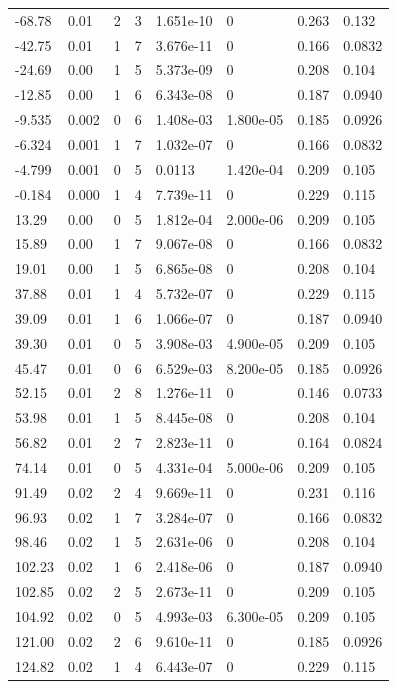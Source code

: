 \documentclass[preview]{standalone}
\begin{document}
{{\begin{tabular}{L{1.2cm}C{1.2cm} C{0.3cm}C{0.5cm} C{1.4cm}C{1.4cm} C{1.4cm}C{1.4cm}}
  -68.78  &  0.01  & 2     &  3 &  1.651e-10  & 0  & 0.263 &  0.132   \\ 
  -42.75  &  0.01  & 1     &  7 &  3.676e-11  & 0  & 0.166 &  0.0832   \\ 
  -24.69  &  0.00  & 1     &  5 &  5.373e-09  & 0  & 0.208 &  0.104   \\ 
  -12.85  &  0.00  & 1     &  6 &  6.343e-08  & 0  & 0.187 &  0.0940   \\ 
  -9.535  &  0.002  & 0     &  6 &  1.408e-03  & 1.800e-05  & 0.185 &  0.0926   \\ 
  -6.324  &  0.001  & 1     &  7 &  1.032e-07  & 0  & 0.166 &  0.0832   \\ 
  -4.799  &  0.001  & 0     &  5 &  0.0113  & 1.420e-04  & 0.209 &  0.105   \\ 
  -0.184  &  0.000  & 1     &  4 &  7.739e-11  & 0  & 0.229 &  0.115   \\ 
  13.29  &  0.00  & 0     &  5 &  1.812e-04  & 2.000e-06  & 0.209 &  0.105   \\ 
  15.89  &  0.00  & 1     &  7 &  9.067e-08  & 0  & 0.166 &  0.0832   \\ 
  19.01  &  0.00  & 1     &  5 &  6.865e-08  & 0  & 0.208 &  0.104   \\ 
  37.88  &  0.01  & 1     &  4 &  5.732e-07  & 0  & 0.229 &  0.115   \\ 
  39.09  &  0.01  & 1     &  6 &  1.066e-07  & 0  & 0.187 &  0.0940   \\ 
  39.30  &  0.01  & 0     &  5 &  3.908e-03  & 4.900e-05  & 0.209 &  0.105   \\ 
  45.47  &  0.01  & 0     &  6 &  6.529e-03  & 8.200e-05  & 0.185 &  0.0926   \\ 
  52.15  &  0.01  & 2     &  8 &  1.276e-11  & 0  & 0.146 &  0.0733   \\ 
  53.98  &  0.01  & 1     &  5 &  8.445e-08  & 0  & 0.208 &  0.104   \\ 
  56.82  &  0.01  & 2     &  7 &  2.823e-11  & 0  & 0.164 &  0.0824   \\ 
  74.14  &  0.01  & 0     &  5 &  4.331e-04  & 5.000e-06  & 0.209 &  0.105   \\ 
  91.49  &  0.02  & 2     &  4 &  9.669e-11  & 0  & 0.231 &  0.116   \\ 
  96.93  &  0.02  & 1     &  7 &  3.284e-07  & 0  & 0.166 &  0.0832   \\ 
  98.46  &  0.02  & 1     &  5 &  2.631e-06  & 0  & 0.208 &  0.104   \\ 
  102.23  &  0.02  & 1     &  6 &  2.418e-06  & 0  & 0.187 &  0.0940   \\ 
  102.85  &  0.02  & 2     &  5 &  2.673e-11  & 0  & 0.209 &  0.105   \\ 
  104.92  &  0.02  & 0     &  5 &  4.993e-03  & 6.300e-05  & 0.209 &  0.105   \\ 
  121.00  &  0.02  & 2     &  6 &  9.610e-11  & 0  & 0.185 &  0.0926   \\ 
  124.82  &  0.02  & 1     &  4 &  6.443e-07  & 0  & 0.229 &  0.115   \\ 
\hline 
\end{tabular} 

}}
\end{document}
